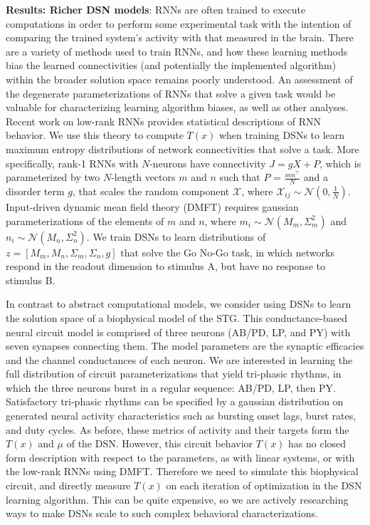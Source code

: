 \documentclass[12pt]{article}
\begin{document}
\noindent \textbf{Results: Richer DSN models}: RNNs are often trained to execute computations in order to perform some experimental task with the intention of comparing the trained system's activity with that measured in the brain.  There are a variety of methods used to train RNNs, and how these learning methods bias the learned connectivities (and potentially the implemented algorithm) within the broader solution space remains poorly understood.  An assessment of the degenerate parameterizations of RNNs that solve a given task would be valuable for characterizing learning algorithm biases, as well as other analyses.   Recent work on low-rank RNNs \cite{mastrogiuseppe2018linking} provides statistical descriptions of RNN behavior.  We use this theory to compute $T(x)$ when training DSNs to learn maximum entropy distributions of network connectivities that solve a task.  More specifically, rank-1 RNNs with $N$-neurons have connectivity $J = gX + P$, which is parameterized by two $N$-length vectors $m$ and $n$ such that $P$ = $\frac{mn^\top}{N}$ and a disorder term $g$, that scales the random component $\mathcal{X}$, where $\mathcal{X}_{ij} \sim \mathcal{N}(0, \frac{1}{N})$.  Input-driven dynamic mean field theory (DMFT) requires gaussian parameterizations of the elements of $m$ and $n$, where $m_i \sim \mathcal{N}(M_m, \Sigma_m^2)$ and $n_i \sim \mathcal{N}(M_n, \Sigma_n^2)$.  We train DSNs to learn distributions of $z = \left[M_m, M_n, \Sigma_m, \Sigma_n, g\right]$ that solve the Go No-Go task, in which networks respond in the readout dimension to stimulus A, but have no response to stimulus B.

\noindent In contrast to abstract computational models, we consider using DSNs to learn the solution space of a biophysical model of the STG.  This  conductance-based neural circuit model is comprised of three neurons (AB/PD, LP, and PY) with seven synapses connecting them.  The model parameters are the synaptic efficacies and the channel conductances of each neuron.  We are interested in learning the full distribution of circuit parameterizations that yield tri-phasic rhythms, in which the three neurons burst in  a regular sequence: AB/PD, LP, then PY.  Satisfactory tri-phasic rhythms can be specified by a gaussian distribution on generated neural activity characteristics such as bursting onset lags, burst rates, and duty cycles.  As before, these metrics of activity and their targets form the $T(x)$ and $\mu$ of the DSN.  However, this circuit behavior $T(x)$ has no closed form description with respect to the parameters, as with linear systems, or with the low-rank RNNs using DMFT.  Therefore we need to simulate this biophysical circuit, and directly measure $T(x)$ on each iteration of optimization in the DSN learning algorithm.  This can be quite expensive, so we are actively researching ways to make DSNs scale to such complex behavioral characterizations.
\end{document}
